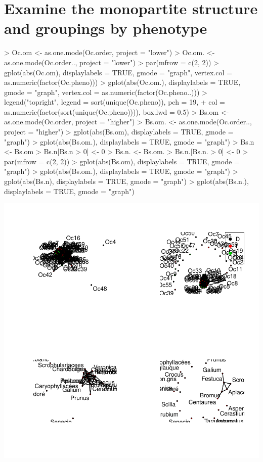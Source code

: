 \documentclass[12pt]{article}
\begin{document}
\section{Examine the monopartite structure and groupings by phenotype}

\begin{Schunk}
\begin{Sinput}
> Oc.om <- as.one.mode(Oc.order, project = "lower")
> Oc.om. <- as.one.mode(Oc.order.., project = "lower")
> par(mfrow = c(2, 2))
> gplot(abs(Oc.om), displaylabels = TRUE, gmode = "graph", vertex.col = as.numeric(factor(Oc.pheno)))
> gplot(abs(Oc.om.), displaylabels = TRUE, gmode = "graph", vertex.col = as.numeric(factor(Oc.pheno..)))
> legend("topright", legend = sort(unique(Oc.pheno)), pch = 19, 
+     col = as.numeric(factor(sort(unique(Oc.pheno)))), box.lwd = 0.5)
> Bs.om <- as.one.mode(Oc.order, project = "higher")
> Bs.om. <- as.one.mode(Oc.order.., project = "higher")
> gplot(abs(Bs.om), displaylabels = TRUE, gmode = "graph")
> gplot(abs(Bs.om.), displaylabels = TRUE, gmode = "graph")
> Bs.n <- Bs.om
> Bs.n[Bs.n > 0] <- 0
> Bs.n. <- Bs.om.
> Bs.n.[Bs.n. > 0] <- 0
> par(mfrow = c(2, 2))
> gplot(abs(Bs.om), displaylabels = TRUE, gmode = "graph")
> gplot(abs(Bs.om.), displaylabels = TRUE, gmode = "graph")
> gplot(abs(Bs.n), displaylabels = TRUE, gmode = "graph")
> gplot(abs(Bs.n.), displaylabels = TRUE, gmode = "graph")
\end{Sinput}
\end{Schunk}
\includegraphics{O_cornuta_ms-017}
\end{document}
